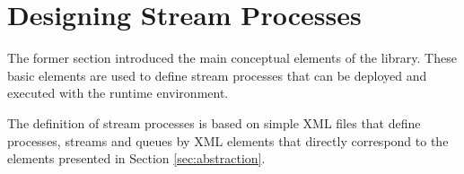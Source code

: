 \section{\label{sec:processDesign}Designing Stream Processes}
The former section introduced the main conceptual elements of the \streams library.
These basic elements are used to define stream processes that can be deployed and
executed with the \streams runtime environment.

The definition of stream processes is based on simple XML files that define processes,
streams and queues by XML elements that directly correspond to the elements presented
in Section \ref{sec:abstraction}.




